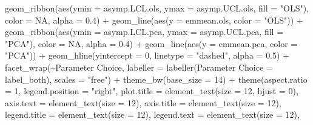 \documentclass[print]{nuthesis}
\newenvironment{Shaded}{\begin{snugshade}}{\end{snugshade}}
\newcommand{\AttributeTok}[1]{\textcolor[rgb]{0.77,0.63,0.00}{#1}}
\newcommand{\ConstantTok}[1]{\textcolor[rgb]{0.00,0.00,0.00}{#1}}
\newcommand{\DecValTok}[1]{\textcolor[rgb]{0.00,0.00,0.81}{#1}}
\newcommand{\FloatTok}[1]{\textcolor[rgb]{0.00,0.00,0.81}{#1}}
\newcommand{\FunctionTok}[1]{\textcolor[rgb]{0.00,0.00,0.00}{#1}}
\newcommand{\NormalTok}[1]{#1}
\newcommand{\OtherTok}[1]{\textcolor[rgb]{0.56,0.35,0.01}{#1}}
\newcommand{\SpecialCharTok}[1]{\textcolor[rgb]{0.00,0.00,0.00}{#1}}
\newcommand{\StringTok}[1]{\textcolor[rgb]{0.31,0.60,0.02}{#1}}
\begin{document}
\begin{Shaded}
\begin{Highlighting}[]
  \FunctionTok{geom\_ribbon}\NormalTok{(}\FunctionTok{aes}\NormalTok{(}\AttributeTok{ymin =}\NormalTok{ asymp.LCL.ols, }\AttributeTok{ymax =}\NormalTok{ asymp.UCL.ols, }\AttributeTok{fill =} \StringTok{"OLS"}\NormalTok{), }\AttributeTok{color =} \ConstantTok{NA}\NormalTok{, }\AttributeTok{alpha =} \FloatTok{0.4}\NormalTok{) }\SpecialCharTok{+}
  \FunctionTok{geom\_line}\NormalTok{(}\FunctionTok{aes}\NormalTok{(}\AttributeTok{y =}\NormalTok{ emmean.ols, }\AttributeTok{color =} \StringTok{"OLS"}\NormalTok{)) }\SpecialCharTok{+}
  \FunctionTok{geom\_ribbon}\NormalTok{(}\FunctionTok{aes}\NormalTok{(}\AttributeTok{ymin =}\NormalTok{ asymp.LCL.pca, }\AttributeTok{ymax =}\NormalTok{ asymp.UCL.pca, }\AttributeTok{fill =} \StringTok{"PCA"}\NormalTok{), }\AttributeTok{color =} \ConstantTok{NA}\NormalTok{, }\AttributeTok{alpha =} \FloatTok{0.4}\NormalTok{) }\SpecialCharTok{+}
  \FunctionTok{geom\_line}\NormalTok{(}\FunctionTok{aes}\NormalTok{(}\AttributeTok{y =}\NormalTok{ emmean.pca, }\AttributeTok{color =} \StringTok{"PCA"}\NormalTok{)) }\SpecialCharTok{+}
  \FunctionTok{geom\_hline}\NormalTok{(}\AttributeTok{yintercept =} \DecValTok{0}\NormalTok{, }\AttributeTok{linetype =} \StringTok{"dashed"}\NormalTok{, }\AttributeTok{alpha =} \FloatTok{0.5}\NormalTok{) }\SpecialCharTok{+}
  \FunctionTok{facet\_wrap}\NormalTok{(}\SpecialCharTok{\textasciitilde{}}\StringTok{\textasciigrave{}}\AttributeTok{Parameter Choice}\StringTok{\textasciigrave{}}\NormalTok{, }\AttributeTok{labeller =} \FunctionTok{labeller}\NormalTok{(}\StringTok{\textasciigrave{}}\AttributeTok{Parameter Choice}\StringTok{\textasciigrave{}} \OtherTok{=}\NormalTok{ label\_both), }\AttributeTok{scales =} \StringTok{"free"}\NormalTok{) }\SpecialCharTok{+}
  \FunctionTok{theme\_bw}\NormalTok{(}\AttributeTok{base\_size =} \DecValTok{14}\NormalTok{) }\SpecialCharTok{+}
  \FunctionTok{theme}\NormalTok{(}\AttributeTok{aspect.ratio =} \DecValTok{1}\NormalTok{,}
        \AttributeTok{legend.position =} \StringTok{"right"}\NormalTok{,}
        \AttributeTok{plot.title   =} \FunctionTok{element\_text}\NormalTok{(}\AttributeTok{size =} \DecValTok{12}\NormalTok{, }\AttributeTok{hjust =} \DecValTok{0}\NormalTok{),}
        \AttributeTok{axis.text    =} \FunctionTok{element\_text}\NormalTok{(}\AttributeTok{size =} \DecValTok{12}\NormalTok{),}
        \AttributeTok{axis.title   =} \FunctionTok{element\_text}\NormalTok{(}\AttributeTok{size =} \DecValTok{12}\NormalTok{),}
        \AttributeTok{legend.title =} \FunctionTok{element\_text}\NormalTok{(}\AttributeTok{size =} \DecValTok{12}\NormalTok{),}
        \AttributeTok{legend.text  =} \FunctionTok{element\_text}\NormalTok{(}\AttributeTok{size =} \DecValTok{12}\NormalTok{),}

\end{Highlighting}
\end{Shaded}
\end{document}
